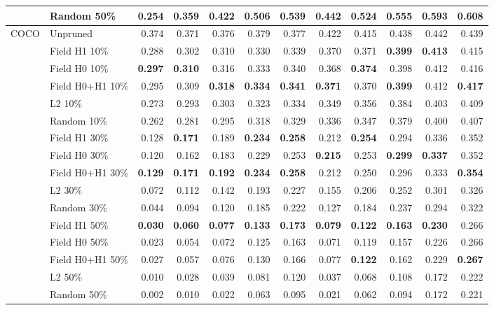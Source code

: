 \begin{tabular}{llrrrrrrrrrr}
 & Random 50\% & 0.254 & 0.359 & 0.422 & 0.506 & 0.539 & 0.442 & 0.524 & 0.555 & 0.593 & 0.608 \\
\midrule
COCO & Unpruned & 0.374 & 0.371 & 0.376 & 0.379 & 0.377 & 0.422 & 0.415 & 0.438 & 0.442 & 0.439 \\
 & Field H1 10\% & 0.288 & 0.302 & 0.310 & 0.330 & 0.339 & 0.370 & 0.371 & \textbf{0.399} & \textbf{0.413} & 0.415 \\
 & Field H0 10\% & \textbf{0.297} & \textbf{0.310} & 0.316 & 0.333 & 0.340 & 0.368 & \textbf{0.374} & 0.398 & 0.412 & 0.416 \\
 & Field H0+H1 10\% & 0.295 & 0.309 & \textbf{0.318} & \textbf{0.334} & \textbf{0.341} & \textbf{0.371} & 0.370 & \textbf{0.399} & 0.412 & \textbf{0.417} \\
 & L2 10\% & 0.273 & 0.293 & 0.303 & 0.323 & 0.334 & 0.349 & 0.356 & 0.384 & 0.403 & 0.409 \\
 & Random 10\% & 0.262 & 0.281 & 0.295 & 0.318 & 0.329 & 0.336 & 0.347 & 0.379 & 0.400 & 0.407 \\
\addlinespace[2pt]
 & Field H1 30\% & 0.128 & \textbf{0.171} & 0.189 & \textbf{0.234} & \textbf{0.258} & 0.212 & \textbf{0.254} & 0.294 & 0.336 & 0.352 \\
 & Field H0 30\% & 0.120 & 0.162 & 0.183 & 0.229 & 0.253 & \textbf{0.215} & 0.253 & \textbf{0.299} & \textbf{0.337} & 0.352 \\
 & Field H0+H1 30\% & \textbf{0.129} & \textbf{0.171} & \textbf{0.192} & \textbf{0.234} & \textbf{0.258} & 0.212 & 0.250 & 0.296 & 0.333 & \textbf{0.354} \\
 & L2 30\% & 0.072 & 0.112 & 0.142 & 0.193 & 0.227 & 0.155 & 0.206 & 0.252 & 0.301 & 0.326 \\
 & Random 30\% & 0.044 & 0.094 & 0.120 & 0.185 & 0.222 & 0.127 & 0.184 & 0.237 & 0.294 & 0.322 \\
\addlinespace[2pt]
 & Field H1 50\% & \textbf{0.030} & \textbf{0.060} & \textbf{0.077} & \textbf{0.133} & \textbf{0.173} & \textbf{0.079} & \textbf{0.122} & \textbf{0.163} & \textbf{0.230} & 0.266 \\
 & Field H0 50\% & 0.023 & 0.054 & 0.072 & 0.125 & 0.163 & 0.071 & 0.119 & 0.157 & 0.226 & 0.266 \\
 & Field H0+H1 50\% & 0.027 & 0.057 & 0.076 & 0.130 & 0.166 & 0.077 & \textbf{0.122} & 0.162 & 0.229 & \textbf{0.267} \\
 & L2 50\% & 0.010 & 0.028 & 0.039 & 0.081 & 0.120 & 0.037 & 0.068 & 0.108 & 0.172 & 0.222 \\
 & Random 50\% & 0.002 & 0.010 & 0.022 & 0.063 & 0.095 & 0.021 & 0.062 & 0.094 & 0.172 & 0.221 \\
\bottomrule
\end{tabular}
